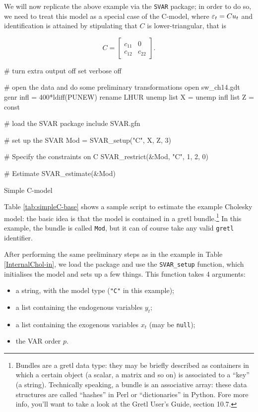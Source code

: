 \documentclass[a4paper,10pt]{article}
\newcommand{\app}[1]{\textsf{#1}}
\newcounter{script}[section]
\newcommand{\PrE}[1]{\ensuremath \varepsilon_{#1}}
\newcommand{\StS}[1]{\ensuremath u_{#1}}
\begin{document}
We will now replicate the above example via the \texttt{SVAR} package;
in order to do so, we need to treat this model as a special case of
the C-model, where $\PrE{t} = C \StS{t}$ and identification is
attained by stipulating that $C$ is lower-triangular, that is

\begin{equation}
  \label{eq:cholesky}
  C = \left[ \begin{array}{ll} 
      c_{11} & 0 \\ c_{12} & c_{22}    
  \end{array} \right].
\end{equation}

\begin{table}[htbp]
\begin{scode}
# turn extra output off
set verbose off

# open the data and do some preliminary transformations
open sw_ch14.gdt
genr infl = 400*ldiff(PUNEW)
rename LHUR unemp
list X = unemp infl
list Z = const

# load the SVAR package
include SVAR.gfn

# set up the SVAR
Mod = SVAR_setup("C", X, Z, 3)

# Specify the constraints on C
SVAR_restrict(&Mod, "C", 1, 2, 0)

# Estimate
SVAR_estimate(&Mod)
  \end{scode}
  \caption{Simple C-model}
  \label{tab:simpleC-base}
\end{table}

Table \ref{tab:simpleC-base} shows a sample script to estimate the
example Cholesky model: the basic idea is that the model is contained
in a \app{gretl} bundle.\footnote{Bundles are a \app{gretl} data type:
  they may be briefly described as containers in which a certain
  object (a scalar, a matrix and so on) is associated to a ``key'' (a
  string). Technically speaking, a bundle is an associative array:
  these data structures are called ``hashes'' in Perl or
  ``dictionaries'' in Python. Fore more info, you'll want to take a
  look at the Gretl User's Guide, section 10.7.} In this example,
the bundle is called \texttt{Mod}, but it can of course take any valid
\texttt{gretl} identifier.

After performing the same preliminary steps as in the example in Table
\ref{InternalChol-in}, we load the package and use the
\texttt{SVAR\_setup} function, which initialises the model and sets up
a few things. This function takes 4 arguments:
\begin{itemize}
\item a string, with the model type (\texttt{"C"} in this example);
\item a list containing the endogenous variables $y_t$;
\item a list containing the exogenous variables $x_t$ (may be
  \texttt{null});
\item the VAR order $p$.
\end{itemize}
\end{document}
